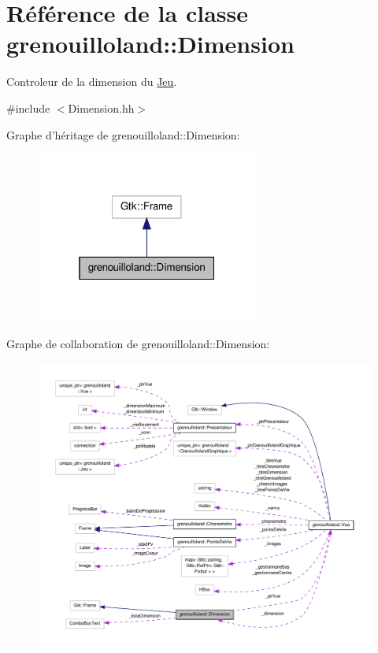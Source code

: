 \hypertarget{classgrenouilloland_1_1Dimension}{\section{Référence de la classe grenouilloland\-:\-:Dimension}
\label{classgrenouilloland_1_1Dimension}
}


Controleur de la dimension du \hyperlink{classgrenouilloland_1_1Jeu}{Jeu}.  




{\ttfamily \#include $<$Dimension.\-hh$>$}



Graphe d'héritage de grenouilloland\-:\-:Dimension\-:
\nopagebreak
\begin{figure}[H]
\begin{center}
\leavevmode
\includegraphics[width=208pt]{classgrenouilloland_1_1Dimension__inherit__graph}
\end{center}
\end{figure}


Graphe de collaboration de grenouilloland\-:\-:Dimension\-:
\nopagebreak
\begin{figure}[H]
\begin{center}
\leavevmode
\includegraphics[width=350pt]{classgrenouilloland_1_1Dimension__coll__graph}
\end{center}
\end{figure}
